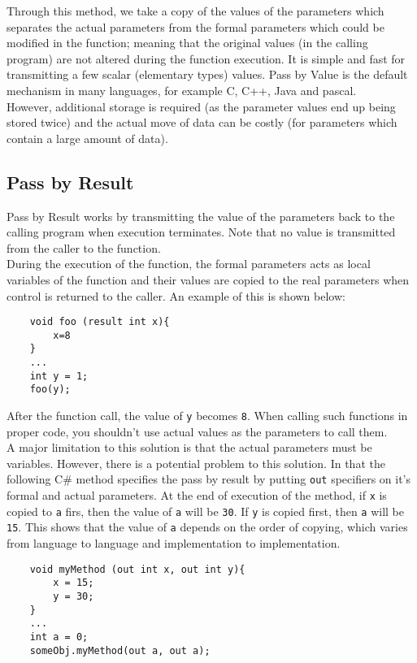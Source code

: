 Through this method, we take a copy of the values of the parameters which separates the actual parameters from the formal parameters which could be modified in the function; meaning that the original values (in the calling program) are not altered during the function execution. It is simple and fast for transmitting a few scalar (elementary types) values. Pass by Value is the default mechanism in many languages, for example C, C++, Java and pascal.\\

However, additional storage is required (as the parameter values end up being stored twice) and the actual move of data can be costly (for parameters which contain a large amount of data). 

\subsection{Pass by Result}
Pass by Result works by transmitting the value of the parameters back to the calling program when execution terminates. Note that no value is transmitted from the caller to the function.\\

During the execution of the function, the formal parameters acts as local variables of the function and their values are copied to the real parameters when control is returned to the caller. An example of this is shown below:
\begin{verbatim}
    void foo (result int x){
        x=8
    }
    ...
    int y = 1;
    foo(y);
\end{verbatim}
After the function call, the value of \verb|y| becomes \verb|8|. When calling such functions in proper code, you shouldn't use actual values as the parameters to call them.\\

A major limitation to this solution is that the actual parameters must be variables. However, there is a potential problem to this solution. In that the following C\# method specifies the pass by result by putting \verb|out| specifiers on it's formal and actual parameters. At the end of execution of the method, if \verb|x| is copied to \verb|a| firs, then the value of \verb|a| will be \verb|30|. If \verb|y| is copied first, then \verb|a| will be \verb|15|. This shows that the value of \verb|a| depends on the order of copying, which varies from language to language and implementation to implementation. 

\begin{verbatim}
    void myMethod (out int x, out int y){
        x = 15;
        y = 30;
    }
    ...
    int a = 0;
    someObj.myMethod(out a, out a);
\end{verbatim}

